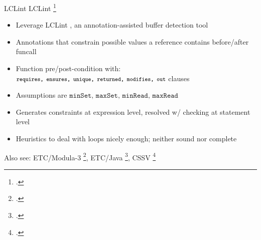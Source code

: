 \documentclass[aspectratio=169]{beamer}
\begin{document}

\begin{frame}[fragile]{LCLint}
LCLint \footcite{larochelle_statically_2001}
\begin{itemize}
    \item Leverage LCLint , an annotation-assisted buffer detection tool
    \item Annotations that constrain possible values a reference contains before/after funcall
    \item Function pre/post-condition with: $\footnotesize{\texttt{requires, ensures, unique, returned, modifies, out}}$ clauses
    \item Assumptions are $\texttt{minSet, maxSet, minRead, maxRead}$ %
    \item Generates constraints at expression level, resolved w/ checking at statement level
    \item Heuristics to deal with loops nicely enough; neither sound nor complete
\end{itemize}
    Also see: ETC/Modula-3 \footcite{detlefs_overview_1995}, ETC/Java \footcite{flanagan_extended_2002}, CSSV \footcite{dor_cssv:_2003}
    \vspace{0.2in}
\end{frame}

\end{document}

